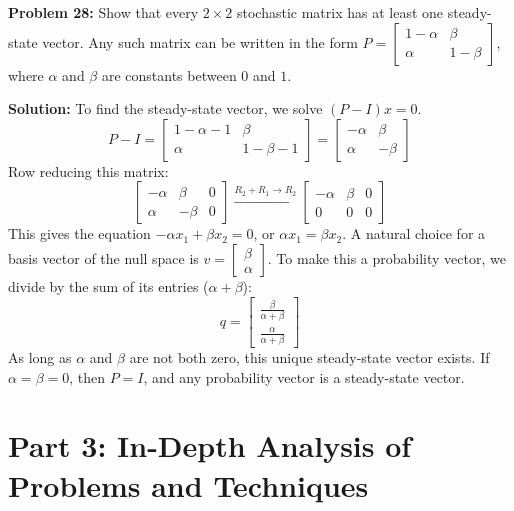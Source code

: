 \documentclass[11pt, letterpaper]{article}
\theoremstyle{definition}
\theoremstyle{remark}
\begin{document}
\textbf{Problem 28:} Show that every $2 \times 2$ stochastic matrix has at least one steady-state vector. Any such matrix can be written in the form $P = \begin{bmatrix} 1-\alpha & \beta \\ \alpha & 1-\beta \end{bmatrix}$, where $\alpha$ and $\beta$ are constants between $0$ and $1$.

\textbf{Solution:}
To find the steady-state vector, we solve $(P - I)x = 0$.
\[ P - I = \begin{bmatrix} 1-\alpha - 1 & \beta \\ \alpha & 1-\beta - 1 \end{bmatrix} = \begin{bmatrix} -\alpha & \beta \\ \alpha & -\beta \end{bmatrix} \]
Row reducing this matrix:
\[ \begin{bmatrix} -\alpha & \beta & 0 \\ \alpha & -\beta & 0 \end{bmatrix} \xrightarrow{R_2 + R_1 \to R_2} \begin{bmatrix} -\alpha & \beta & 0 \\ 0 & 0 & 0 \end{bmatrix} \]
This gives the equation $-\alpha x_1 + \beta x_2 = 0$, or $\alpha x_1 = \beta x_2$.
A natural choice for a basis vector of the null space is $v = \begin{bmatrix} \beta \\ \alpha \end{bmatrix}$.
To make this a probability vector, we divide by the sum of its entries ($\alpha + \beta$):
\[ q = \begin{bmatrix} \frac{\beta}{\alpha + \beta} \\ \frac{\alpha}{\alpha + \beta} \end{bmatrix} \]
As long as $\alpha$ and $\beta$ are not both zero, this unique steady-state vector exists. If $\alpha = \beta = 0$, then $P = I$, and any probability vector is a steady-state vector.

\newpage
\section{Part 3: In-Depth Analysis of Problems and Techniques}
\end{document}
